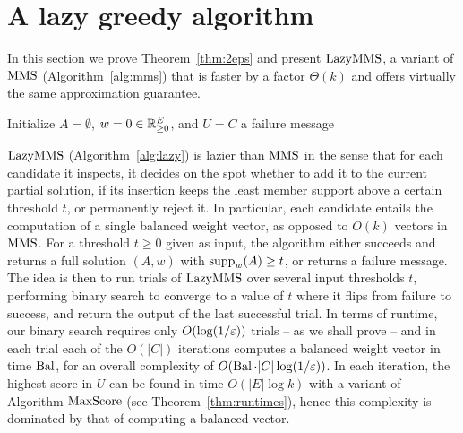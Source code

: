 \section{A lazy greedy algorithm}\label{s:lazymms}

In this section we prove Theorem~\ref{thm:2eps} and present $\lazy$, a variant of $\operatorname{MMS}$ (Algorithm~\ref{alg:mms}) that is faster by a factor $\Theta(k)$ and offers virtually the same approximation guarantee.

\begin{algorithm}[htb]
\SetAlgoLined
{}
Initialize $A=\emptyset$, $w=0\in\mathbb{R}_{\geq 0}^E$, and $U=C$ \;
\Return a failure message\;
\caption{$\lazy$}
\label{alg:lazy}
\end{algorithm}

$\lazy$ (Algorithm~\ref{alg:lazy}) is lazier than $\operatorname{MMS}$ in the sense that for each candidate it inspects, it decides on the spot whether to add it to the current partial solution, if its insertion keeps the least member support above a certain threshold $t$, or permanently reject it. In particular, each candidate entails the computation of a single balanced weight vector, as opposed to $O(k)$ vectors in $\operatorname{MMS}$. 
For a threshold $t\geq 0$ given as input, the algorithm either succeeds and returns a full solution $(A,w)$ with $\operatorname{supp}_w(A)\geq t$, or returns a failure message. 
The idea is then to run trials of $\lazy$ over several input thresholds $t$, performing binary search to converge to a value of $t$ where it flips from failure to success, and return the output of the last successful trial. 
In terms of runtime, our binary search requires only $O(\log (1/\varepsilon))$ trials -- as we shall prove -- and in each trial each of the $O(|C|)$ iterations computes a balanced weight vector in time $\operatorname{Bal}$, for an overall complexity of $O(\operatorname{Bal}\cdot |C| \log (1/\varepsilon))$. 
In each iteration, the highest score in $U$ can be found in time $O(|E|\log k)$ with a variant of Algorithm $\operatorname{MaxScore}$ (see Theorem~\ref{thm:runtimes}), hence this complexity is dominated by that of computing a balanced vector.  

